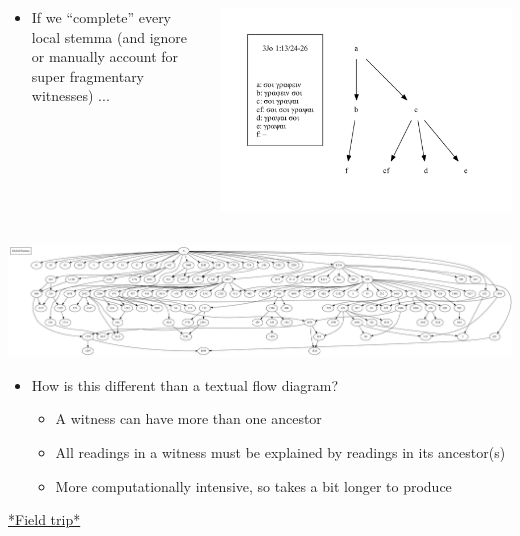 \documentclass[10pt]{beamer}
\begin{document}
	\begin{frame}
		\begin{columns}
			\begin{column}{0.45\textwidth}
				\begin{itemize}
					\item If we ``complete'' every local stemma (and ignore or manually account for super fragmentary witnesses) ...
				\end{itemize}
			\end{column}
			\begin{column}{0.45\textwidth}
				\begin{center}
					\includegraphics[width=\textwidth]{../img/B25K1V13U24-26-local-stemma-complete.pdf}
				\end{center}	
			\end{column}
		\end{columns}
		\begin{center}
			\includegraphics[width=\textwidth]{../img/global-stemma-complete.pdf}
		\end{center}	
	\end{frame}
	\begin{frame}
		\begin{itemize}
			\item How is this different than a textual flow diagram?
			\begin{itemize}
				\item A witness can have more than one ancestor
				\item All readings in a witness must be explained by readings in its ancestor(s)
				\item More computationally intensive, so takes a bit longer to produce
			\end{itemize}
		\end{itemize}
		\begin{center}
			\href{../img/global-stemma-complete-reoriented.pdf}{*Field trip*}
		\end{center}
	\end{frame}
\end{document}
